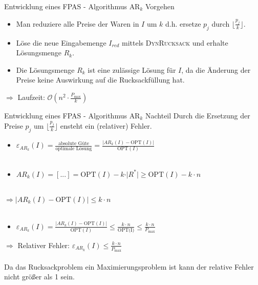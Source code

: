 \begin{frame}{Entwicklung eines FPAS - Algorithmus $\text{AR}_k$ Vorgehen}	
	\begin{itemize}
		\item 
		Man reduziere alle Preise der Waren in $I$ um $k$ d.h. ersetze $p_j$ durch $\displaystyle \lfloor \frac {p_j}{k} \rfloor $.
		\item
		Löse die neue Eingabemenge $I_{red}$ mittels \textsc{DynRucksack} und erhalte Lösungsmenge $R_k$.
		\item
		Die Lösungsmenge $R_k$ ist eine zulässige Lösung für $I$, da die Änderung der Preise keine Auswirkung auf die Rucksackfüllung hat.
		
	\end{itemize}
	$\Rightarrow$ Laufzeit: $\displaystyle \mathcal O(n^2 \cdot \frac{P_{\max}}{k})$
\end{frame}

\begin{frame}{Entwicklung eines FPAS - Algorithmus $\text{AR}_k$ Nachteil}
	Durch die Ersetzung der Preise $p_j$ um $\displaystyle \lfloor \frac {p_j}{k} \rfloor $ ensteht ein (relativer) Fehler.
	\begin{itemize}
		
		\item
		$\displaystyle \varepsilon_{AR_k}(I) = \frac {\text{absolute Güte}} {\text{optimale Lösung}} = \frac{\vert AR_k(I) - \text{OPT}(I) \vert}{\text{OPT}(I)}$ \\~\\
		\pause
		\item
		$AR_k(I) = [...] = \text{OPT}(I) - k \cdot \vert R^* \vert \ge \text{OPT}(I) - k \cdot n$
		\\~\\
	\end{itemize}	
	
	$\Rightarrow \vert AR_k(I) - \text{OPT}(I) \vert \le k \cdot n$\\~\\
	\pause
	\begin{itemize}
		\item
		$\displaystyle \varepsilon_{AR_k}(I) = \frac{\vert AR_k(I) - \text{OPT}(I) \vert}{\text{OPT}(I)} \le \frac{k \cdot  n}{\text{OPT(I)}} \le \frac{k \cdot n}{P_{\max}}$
	\end{itemize}
	
	$\Rightarrow$ Relativer Fehler: $\displaystyle \varepsilon_{AR_k}(I) \le \frac{k \cdot n}{P_{\max}}$\\~\\
	
	Da das Rucksackproblem ein Maximierungsproblem ist kann der relative Fehler nicht größer als 1 sein.
\end{frame}

